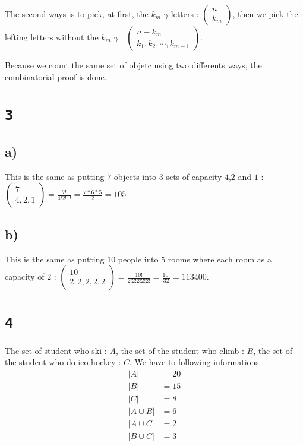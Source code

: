 \documentclass[a4paper,11pt]{report}
\begin{document}
The second ways is to pick, at first, the $k_m$ $\gamma$ letters :
$\begin{pmatrix} n \\ k_m\end{pmatrix}$, then we pick the lefting letters
without the $k_m$ $\gamma$ : $\begin{pmatrix} n-k_m \\
  k_1,k_2,\cdots,k_{m-1} \end{pmatrix}$.

Because we count the same set of objetc using two differents ways, the
combinatorial proof is done.

\section*{\texttt{3}}
\subsection*{a)}
This is the same as putting $7$ objects into $3$ sets of capacity $4$,$2$ and
$1$ : $\begin{pmatrix} 7 \\ 4,2,1\end{pmatrix} = \frac{7!}{4!2!1!} =
\frac{7*6*5}{2} = 105$

\subsection*{b)}
This is the same as putting $10$ people into $5$ rooms where each room as a
capacity of $2$ : $\begin{pmatrix} 10 \\ 2,2,2,2,2\end{pmatrix} =
\frac{10!}{2!2!2!2!2!} = \frac{10!}{32} = 113400$.

\section*{\texttt{4}}
The set of student who ski : $A$, the set of the student who climb : $B$, the
set of the student who do ico hockey : $C$. We have to following informations :
\begin{align*}
  |A| &= 20 \\ 
  |B| &= 15 \\ 
  |C| &= 8 \\
  |A \cup B| &= 6\\
  |A \cup C| &= 2\\
  |B \cup C| &= 3
\end{align*}
\end{document}
